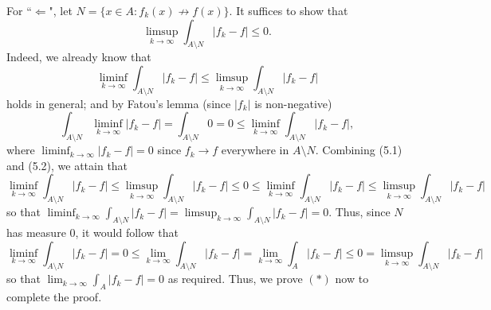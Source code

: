 \noindent For ``$\Leftarrow$", let \( N = \{ x \in A : f_{k} (x) \not\to f(x) \}. \) It suffices to show that \[\limsup_{k \to \infty} \int_{A \setminus N} |f_{k} - f| \leq 0 \tag{$\ast$}. \] Indeed, we already know that \[\liminf_{k \to \infty} \int_{A\setminus N} |f_{k} - f| \leq \limsup _{k \to \infty} \int_{A\setminus N} |f_{k} - f| \tag{5.1}\] holds in general; and by Fatou's lemma (since \( |f_{k} | \) is non-negative) \[\int_{A \setminus N} \liminf_{k \to \infty} |f_{k}  - f | = \int_{A \setminus N} 0 = 0 \leq \liminf_{k \to \infty} \int_{A \setminus N} |f_{k} - f|, \tag{5.2}    \] where \( \liminf_{k \to \infty} |f_{k} - f| = 0  \) since \( f_{k} \to f \) everywhere in \( A \setminus N\). Combining (5.1) and (5.2), we attain that \[\liminf_{k\to \infty} \int_{A\setminus N} |f_{k}  - f | \leq \limsup_{k \to \infty} \int_{A\setminus N} |f_{k} - f| \leq 0 \leq \liminf _{k \to \infty} \int_{A \setminus N} |f_{k} - f| \leq \limsup_{k \to \infty} \int_{A \setminus N} |f_{k} - f| \] so that \( \liminf_{k \to \infty} \int_{A \setminus N} |f_{k} - f| = \limsup_{k \to \infty} \int_{A \setminus N} |f_{k} - f| = 0 \). Thus, since \( N \) has measure 0, it would follow that \[\liminf_{k \to \infty} \int_{A \setminus N} |f_{k} - f| = 0 \leq \lim_{{k} \to {\infty}} \int_{A \setminus N} |f_{k} - f| = \lim_{{k} \to {\infty}} \int_{A} |f_{k} - f| \leq 0 = \limsup_{k \to \infty} \int_{A \setminus N} |f_{k} - f|\] so that \( \lim_{{k} \to {\infty}} \int_{A} |f_{k} - f| = 0 \) as required. Thus, we prove \((\ast)\) now to complete the proof.

